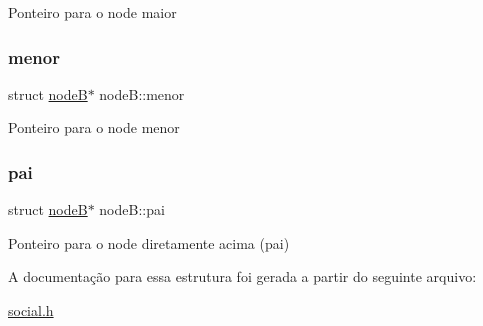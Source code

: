 Ponteiro para o node maior \mbox{\label{structnodeB_a433b5c01c13cba63ca218f887ce3fef7}} 
\subsubsection{\texorpdfstring{menor}{menor}}
{\footnotesize\ttfamily struct \mbox{\hyperlink{structnodeB}{nodeB}}$\ast$ node\+B\+::menor}

Ponteiro para o node menor \mbox{\label{structnodeB_a8b1942214da0ec30a911d3d8f1b2f142}} 
\subsubsection{\texorpdfstring{pai}{pai}}
{\footnotesize\ttfamily struct \mbox{\hyperlink{structnodeB}{nodeB}}$\ast$ node\+B\+::pai}

Ponteiro para o node diretamente acima (pai) 

A documentação para essa estrutura foi gerada a partir do seguinte arquivo\+:\begin{DoxyCompactItemize}
\item 
\mbox{\hyperlink{social_8h}{social.\+h}}\end{DoxyCompactItemize}
